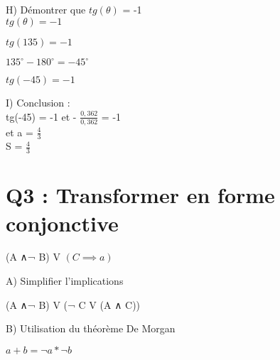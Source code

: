 H) Démontrer que $tg(\theta)$ = -1 \\

$tg(\theta) = -1$ \\
\vspace{5mm} %

$tg(135) = -1$ \\
\vspace{5mm} %

$135^{\circ} -180^{\circ} = -45^{\circ}$ \\
\vspace{5mm} %

$tg(-45) = -1$ \\

\vspace{10mm} %

I) Conclusion : \\

tg(-45) = -1 et - $\frac{0,362}{0,362}$ = -1 \\

et a = $\frac{4}{3}$ \\

S = $\frac{4}{3}$ \\

\newpage

\vspace{10mm} %

\section{Q3 : Transformer en forme conjonctive}

\vspace{4mm} %

(A ∧¬ B) V $(C\implies a)$ \\

\begin{flushleft}
A) Simplifier l’implications \\
\end{flushleft}

  (A ∧¬ B) V (¬ C V (A ∧ C))\\

\begin{flushleft}
B) Utilisation du théorème De Morgan \\
\end{flushleft}

  $a+b = ¬ a * ¬ b$\\

